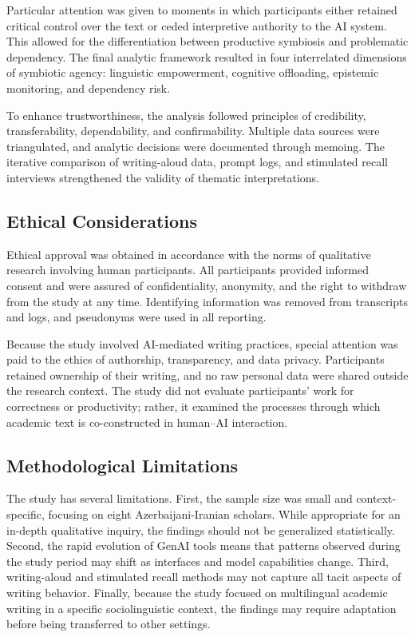 \documentclass[12pt]{article}
\begin{document}
Particular attention was given to moments in which participants either retained critical control over the text or ceded interpretive authority to the AI system. This allowed for the differentiation between productive symbiosis and problematic dependency. The final analytic framework resulted in four interrelated dimensions of symbiotic agency: linguistic empowerment, cognitive offloading, epistemic monitoring, and dependency risk.

To enhance trustworthiness, the analysis followed principles of credibility, transferability, dependability, and confirmability. Multiple data sources were triangulated, and analytic decisions were documented through memoing. The iterative comparison of writing-aloud data, prompt logs, and stimulated recall interviews strengthened the validity of thematic interpretations.

\subsection{Ethical Considerations}
Ethical approval was obtained in accordance with the norms of qualitative research involving human participants. All participants provided informed consent and were assured of confidentiality, anonymity, and the right to withdraw from the study at any time. Identifying information was removed from transcripts and logs, and pseudonyms were used in all reporting.

Because the study involved AI-mediated writing practices, special attention was paid to the ethics of authorship, transparency, and data privacy. Participants retained ownership of their writing, and no raw personal data were shared outside the research context. The study did not evaluate participants' work for correctness or productivity; rather, it examined the processes through which academic text is co-constructed in human--AI interaction.

\subsection{Methodological Limitations}
The study has several limitations. First, the sample size was small and context-specific, focusing on eight Azerbaijani-Iranian scholars. While appropriate for an in-depth qualitative inquiry, the findings should not be generalized statistically. Second, the rapid evolution of GenAI tools means that patterns observed during the study period may shift as interfaces and model capabilities change. Third, writing-aloud and stimulated recall methods may not capture all tacit aspects of writing behavior. Finally, because the study focused on multilingual academic writing in a specific sociolinguistic context, the findings may require adaptation before being transferred to other settings.
\end{document}
